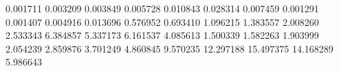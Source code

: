 0.001711
0.003209
0.003849
0.005728
0.010843
0.028314
0.007459
0.001291
0.001407
0.004916
0.013696
0.576952
0.693410
1.096215
1.383557
2.008260
2.533343
6.384857
5.337173
6.161537
4.085613
1.500339
1.582263
1.903999
2.054239
2.859876
3.701249
4.860845
9.570235
12.297188
15.497375
14.168289
5.986643
